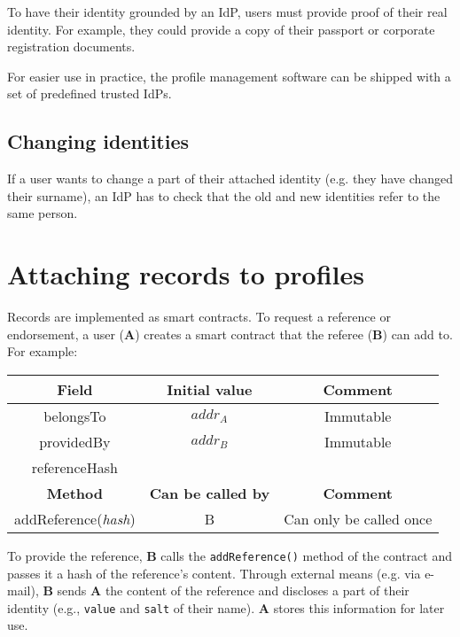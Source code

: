\documentclass[a4paper, bibliography=totoc, titlepage=false]{scrartcl}
\begin{document}
To have their identity grounded by an IdP, users must provide proof of their real identity. For example, they could provide a copy of their passport or corporate registration documents.

For easier use in practice, the profile management software can be shipped with a set of predefined trusted IdPs.

\subsection{Changing identities}

If a user wants to change a part of their attached identity (e.g. they have changed their surname), an IdP has to check that the old and new identities refer to the same person.

\section{Attaching records to profiles}

Records are implemented as smart contracts. To request a reference or endorsement, a user (\textbf{A}) creates a smart contract that the referee (\textbf{B}) can add to. For example:

\begin{center}
\begin{tabular}{|c|c|c|}
	\hline
	\textbf{Field} & \textbf{Initial value} & \textbf{Comment} \\
	\hline
	belongsTo & $addr_{A}$ & Immutable\\
	\hline
	providedBy & $addr_{B}$ & Immutable\\
	\hline	
	referenceHash &  & \\
	\hline
	
	\textbf{Method} & \textbf{Can be called by} & \textbf{Comment}  \\
	\hline
	addReference(\emph{hash}) & B & Can only be called once \\
	\hline
\end{tabular}
\end{center}

To provide the reference, \textbf{B} calls the \texttt{addReference()} method of the contract and passes it a hash of the reference's content. Through external means (e.g. via e-mail), \textbf{B} sends \textbf{A} the content of the reference and discloses a part of their identity (e.g., \texttt{value} and \texttt{salt} of their name). \textbf{A} stores this information for later use.
\end{document}
